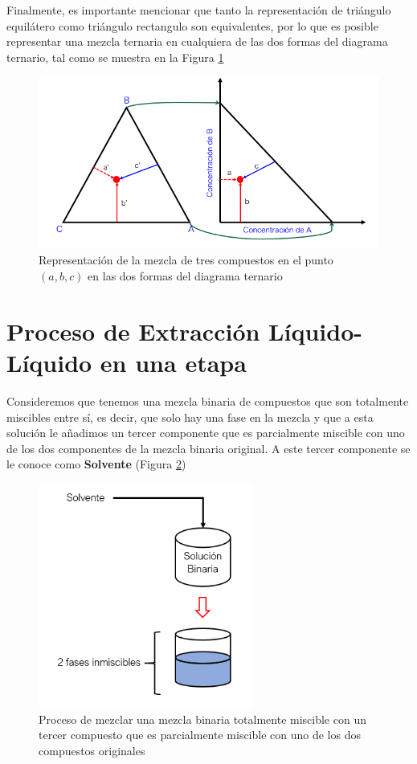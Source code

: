 \documentclass[11pt]{book}
\begin{document}
Finalmente, es importante mencionar que tanto la representación de triángulo equilátero como triángulo rectangulo son equivalentes, por lo que es posible representar una mezcla ternaria en cualquiera de las dos formas del diagrama ternario, tal como se muestra en la Figura \ref{fig:MezclaLiqLiqTrianguloRectangulo_3}

\begin{figure}[H]
    \centering
    \includegraphics{img/LiquidoLiquido/TrianguloRectangulo_3.PNG}
    \caption{Representación de la mezcla de tres compuestos en el punto $(a,b,c)$ en las dos formas del diagrama ternario}
    \label{fig:MezclaLiqLiqTrianguloRectangulo_3}
\end{figure}

\section{Proceso de Extracción Líquido-Líquido en una etapa}

Consideremos que tenemos una mezcla binaria de compuestos que son totalmente miscibles entre sí, es decir, que solo hay una fase en la mezcla y que a esta solución le añadimos un tercer componente que es parcialmente miscible con uno de los dos componentes de la mezcla binaria original. A este tercer componente se le conoce como \textbf{Solvente} (Figura \ref{fig:MezclaLiqLiqSolvente})

\begin{figure}[H]
    \centering
    \includegraphics[width =7cm]{img/LiquidoLiquido/MezclaLiqLiqSolvente.PNG}
    \caption{Proceso de mezclar una mezcla binaria totalmente miscible con un tercer compuesto que es parcialmente miscible con uno de los dos compuestos originales}
    \label{fig:MezclaLiqLiqSolvente}
\end{figure}
\end{document}
